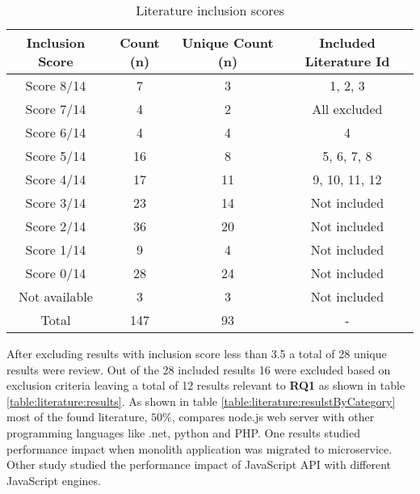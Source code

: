 \begin{table}[ht!]
    \begin{tabular}{|c c c c|} 
        \hline
        Inclusion Score
        & Count (n)
        & Unique Count (n)
        & Included Literature Id
        \\ 
        \hline\hline
        Score 8/14
        & 7
        & 3
        & 1, 2, 3
        \\ 
        \hline
        Score 7/14
        & 4
        & 2
        & All excluded
        \\ 
        \hline
        Score 6/14
        & 4
        & 4
        & 4
        \\ 
        \hline
        Score 5/14
        & 16
        & 8
        & 5, 6, 7, 8
        \\ 
        \hline
        Score 4/14
        & 17
        & 11
        & 9, 10, 11, 12
        \\ 
        \hline
        Score 3/14
        & 23
        & 14
        & Not included
        \\ 
        \hline
        Score 2/14
        & 36
        & 20
        & Not included
        \\ 
        \hline
        Score 1/14
        & 9
        & 4
        & Not included
        \\ 
        \hline
        Score 0/14
        & 28
        & 24
        & Not included
        \\ 
        \hline
        Not available
        & 3
        & 3
        & Not included
        \\ 
        \hline
        Total
        & 147
        & 93
        & -
        \\ 
        \hline
    \end{tabular}    
    \caption{Literature inclusion scores}
    \label{table:literature:inclusionResults}
\end{table}
After excluding results with inclusion score less than 3.5 a total of 28 unique results were review.
Out of the 28 included results 16 were excluded based on exclusion criteria leaving a total of 12 results relevant to \textbf{RQ1} as shown in table \ref{table:literature:results}.
As shown in table \ref{table:literature:resulstByCategory} most of the found literature, $50\%$, compares node.js web server with other programming languages like .net, python and PHP.
One results studied performance impact when monolith application was migrated to microservice.
Other study studied the performance impact of JavaScript API with different JavaScript engines.

